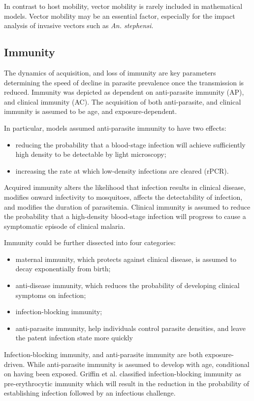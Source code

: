 \documentclass[a4paper, 12pt, twoside]{report}
\begin{document}
In contrast to host mobility, vector mobility is rarely included in mathematical models.
Vector mobility may be an essential factor, especially for the impact analysis of invasive vectors such as \textit{An. stephensi}.

\subsection{Immunity}
The dynamics of acquisition, and loss of immunity are key parameters determining the speed of decline in parasite prevalence once the transmission is reduced.
Immunity was depicted as dependent on anti-parasite immunity (AP), and clinical immunity (AC).
The acquisition of both anti-parasite, and clinical immunity is assumed to be age, and exposure-dependent.

In particular, models assumed anti-parasite immunity to have two effects:
\begin{itemize}
	\item reducing the probability that a blood-stage infection will achieve sufficiently high density to be detectable by light microscopy;
	\item increasing the rate at which low-density infections are cleared (rPCR).
\end{itemize}
Acquired immunity alters the likelihood that infection results in clinical disease, modifies onward infectivity to mosquitoes, affects the detectability of infection, and modifies the duration of parasitemia.
Clinical immunity is assumed to reduce the probability that a high-density blood-stage infection will progress to cause a symptomatic episode of clinical malaria.

Immunity could be further dissected into four categories:
\begin{itemize}
	\item  maternal immunity, which protects against clinical disease, is assumed to decay exponentially from birth;
	\item  anti-disease immunity, which reduces the probability of developing clinical symptoms on infection;
	\item infection-blocking immunity;
	\item anti-parasite immunity, help individuals control parasite densities, and leave the patent infection state more quickly
\end{itemize}
Infection-blocking immunity, and anti-parasite immunity are both exposure-driven.
While anti-parasite immunity is assumed to develop with age, conditional on having been exposed.
Griffin et al.\cite{Griffin2010} classified infection-blocking immunity as pre-erythrocytic immunity which will result in the reduction in the probability of establishing infection followed by an infectious challenge.
\end{document}
